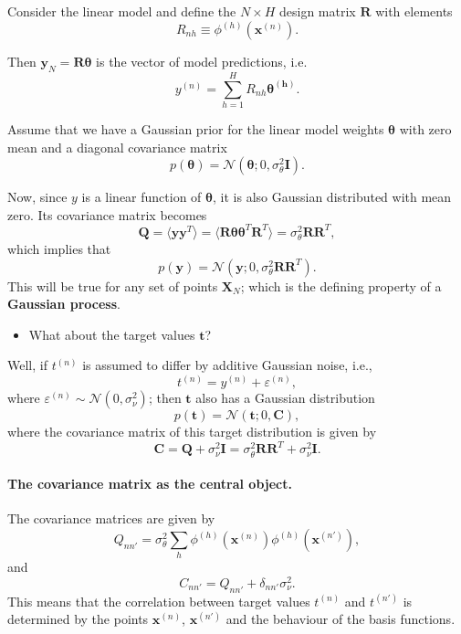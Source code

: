 \documentclass[%
oneside,                 %
final,                   %
10pt]{article}
\begin{document}
Consider the linear model and define the $N \times H$ design matrix $\boldsymbol{R}$ with elements
\[
R_{nh} \equiv \phi^{(h)} \left( \boldsymbol{x}^{(n)} \right).
\]

Then $\boldsymbol{y}_N = \boldsymbol{R} \boldsymbol{\theta}$ is the vector of model predictions, i.e.
\[
y^{(n)} = \sum_{h=1}^H R_{nh} \boldsymbol{\theta^{(h)}}.
\]

Assume that we have a Gaussian prior for the linear model weights $\boldsymbol{\theta}$ with zero mean and a diagonal covariance matrix
\[
p(\boldsymbol{\theta}) = \mathcal{N} \left( \boldsymbol{\theta}; 0, \sigma_\theta^2 \boldsymbol{I} \right).
\]

Now, since $y$ is a linear function of $\boldsymbol{\theta}$, it is also Gaussian distributed with mean zero. Its covariance matrix becomes
\[
\boldsymbol{Q} = \langle \boldsymbol{y} \boldsymbol{y}^T \rangle = \langle \boldsymbol{R} \boldsymbol{\theta} \boldsymbol{\theta}^T \boldsymbol{R}^T \rangle
= \sigma_\theta^2 \boldsymbol{R} \boldsymbol{R}^T,
\]
which implies that
\[
p(\boldsymbol{y}) = \mathcal{N} \left( \boldsymbol{y}; 0, \sigma_\theta^2 \boldsymbol{R} \boldsymbol{R}^T \right).
\]
This will be true for any set of points $\boldsymbol{X}_N$; which is the defining property of a \textbf{Gaussian process}.

\begin{itemize}
\item What about the target values $\boldsymbol{t}$?
\end{itemize}

\noindent
Well, if $t^{(n)}$ is assumed to differ by additive Gaussian noise, i.e., 
\[
t^{(n)} = y^{(n)} + \varepsilon^{(n)}, 
\]
where $\varepsilon^{(n)} \sim \mathcal{N} \left( 0, \sigma_\nu^2 \right)$; then $\boldsymbol{t}$ also has a Gaussian distribution
\[
p(\boldsymbol{t}) = \mathcal{N} \left( \boldsymbol{t}; 0, \boldsymbol{C} \right),
\]
where the covariance matrix of this target distribution is given by
\[
\boldsymbol{C} = \boldsymbol{Q} + \sigma_\nu^2 \boldsymbol{I} = \sigma_\theta^2 \boldsymbol{R} \boldsymbol{R}^T + \sigma_\nu^2 \boldsymbol{I}.
\]

\paragraph{The covariance matrix as the central object.}
The covariance matrices are given by
\[
Q_{nn'} = \sigma_\theta^2 \sum_h \phi^{(h)} \left( \boldsymbol{x}^{(n)} \right) \phi^{(h)} \left( \boldsymbol{x}^{(n')} \right),
\]
and
\[
C_{nn'} = Q_{nn'} + \delta_{nn'} \sigma_\nu^2.
\]
This means that the correlation between target values $t^{(n)}$ and $t^{(n')}$ is determined by the points $\boldsymbol{x}^{(n)}$, $\boldsymbol{x}^{(n')}$ and the behaviour of the basis functions.
\end{document}
